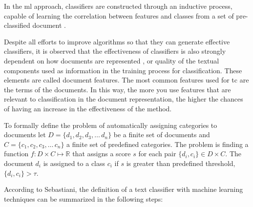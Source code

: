 In the \gls{ml} approach, classifiers are constructed through an inductive process, capable of learning the correlation between features and classes from a set of pre-classified document \cite{Sebastiani:2002}.

Despite all efforts to improve algorithms so that they can generate effective classifiers, it is observed that the effectiveness of classifiers is also strongly dependent on how documents are represented \cite{Gabrilovich:2006, bekkerman2004using, supreethi2010novel}, or quality of the textual components used as information in the training process for classification. These elements are called document features. The most common features used for \gls{tc} are the terms of the documents. In this way, the more you use features that are relevant to classification in the document representation, the higher the chances of having an increase in the effectiveness of the method.


To formally define the problem of automatically assigning categories to documents let $D = \{d_1,d_2,d_3,\ldots\,d_n\}$ be a finite set of documents and $C = \{c_1,c_2,c_3,\ldots\,c_n\}$ a finite set of predefined categories.
The problem is finding a function $f: D \times C \mapsto \mathbb{R}$ that assigns a score $s$ for each pair 
$\{d_i, c_i\} \in  D \times C $. The document $d_i$ is assigned to a class $c_i$ if $s$ is greater than predefined threshold, $\{d_i, c_i\} > \tau$.

According to Sebastiani\cite{Sebastiani:2002}, the definition of a text classifier with machine learning techniques can be summarized in the following steps:

